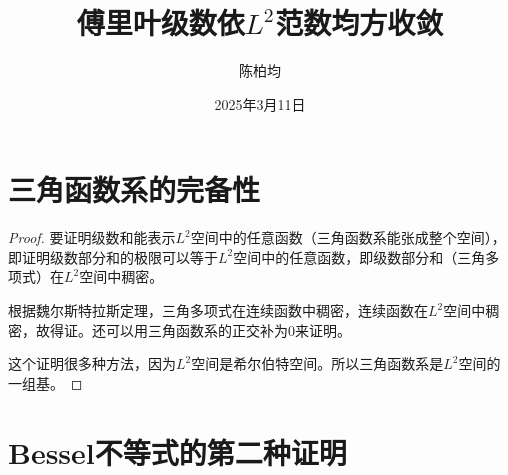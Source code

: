 \documentclass[12pt,a4paper]{article}
\title{傅里叶级数依$L^2$范数均方收敛}
\author{陈柏均}
\date{2025年3月11日}
\numberwithin{subsection}{section}   %
\numberwithin{subsubsection}{subsection}
\theoremstyle{plain}
\theoremstyle{definition}
\theoremstyle{remark}
\theoremstyle{remark}
\begin{document}
	\maketitle

	\tableofcontents  %
	
	
	\newpage
	
\section{三角函数系的完备性}	
\begin{proof}
要证明级数和能表示$L^2$空间中的任意函数（三角函数系能张成整个空间），即证明级数部分和的极限可以等于$L^2$空间中的任意函数，即级数部分和（三角多项式）在$L^2$空间中稠密。

	根据魏尔斯特拉斯定理，三角多项式在连续函数中稠密，连续函数在$L^2$空间中稠密，故得证。还可以用三角函数系的正交补为0来证明。
	
这个证明很多种方法，因为$L^2$空间是希尔伯特空间。所以三角函数系是$L^2$空间的一组基。
\end{proof}
	
	\section{Bessel不等式的第二种证明}
	
\end{document}
